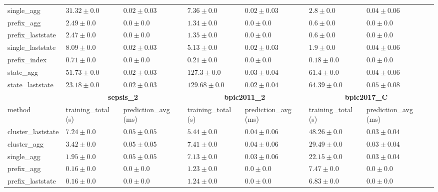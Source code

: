 \documentclass[twoside,11pt]{Latex/Classes/PhDthesisPSnPDF}
\begin{document}
\begin{table}[!htbp]
{\begin{tabular}{llllllll}
					single\_agg & $31.32 \pm 0.0$ & $0.02 \pm 0.03$ & $7.36 \pm 0.0$ & $0.02 \pm 0.03$ & $2.8 \pm 0.0$ & $0.04 \pm 0.06$ \\ 
					prefix\_agg & $2.49 \pm 0.0$ & $\mathbf{0.0 \pm 0.0}$ & $1.34 \pm 0.0$ & $\mathbf{0.0 \pm 0.0}$ & $0.6 \pm 0.0$ & $\mathbf{0.0 \pm 0.0}$ \\ 
					prefix\_laststate & $2.47 \pm 0.0$ & $\mathbf{0.0 \pm 0.0}$ & $1.35 \pm 0.0$ & $\mathbf{0.0 \pm 0.0}$ & $0.6 \pm 0.0$ & $\mathbf{0.0 \pm 0.0}$ \\ 
					single\_laststate & $8.09 \pm 0.0$ & $0.02 \pm 0.03$ & $5.13 \pm 0.0$ & $0.02 \pm 0.03$ & $1.9 \pm 0.0$ & $0.04 \pm 0.06$ \\ 
					prefix\_index & $\mathbf{0.71 \pm 0.0}$ & $\mathbf{0.0 \pm 0.0}$ & $\mathbf{0.21 \pm 0.0}$ & $\mathbf{0.0 \pm 0.0}$ & $\mathbf{0.18 \pm 0.0}$ & $\mathbf{0.0 \pm 0.0}$ \\ 
					state\_agg & $51.73 \pm 0.0$ & $0.02 \pm 0.03$ & $127.3 \pm 0.0$ & $0.03 \pm 0.04$ & $61.4 \pm 0.0$ & $0.04 \pm 0.06$ \\ 
					state\_laststate & $23.18 \pm 0.0$ & $0.02 \pm 0.03$ & $129.68 \pm 0.0$ & $0.02 \pm 0.04$ & $64.39 \pm 0.0$ & $0.05 \pm 0.08$ \\ 
					\bottomrule
					\toprule
					& \multicolumn{2}{c}{{\bfseries sepsis\_2}} & \multicolumn{2}{c}{{\bfseries bpic2011\_2}} & \multicolumn{2}{c}{{\bfseries bpic2017\_C}} \\ \cmidrule(lr){2-3} \cmidrule(lr){4-5} \cmidrule(lr){6-7}
					method  & training\_total (s) & prediction\_avg (ms) & training\_total (s) & prediction\_avg (ms) & training\_total (s) & prediction\_avg (ms) \\ \midrule
					cluster\_laststate & $7.24 \pm 0.0$ & $0.05 \pm 0.05$ & $5.44 \pm 0.0$ & $0.04 \pm 0.06$ & $48.26 \pm 0.0$ & $0.03 \pm 0.04$ \\ 
					cluster\_agg & $3.42 \pm 0.0$ & $0.05 \pm 0.05$ & $7.41 \pm 0.0$ & $0.04 \pm 0.06$ & $29.49 \pm 0.0$ & $0.03 \pm 0.04$ \\ 
					single\_agg & $1.95 \pm 0.0$ & $0.05 \pm 0.05$ & $7.13 \pm 0.0$ & $0.03 \pm 0.06$ & $22.15 \pm 0.0$ & $0.03 \pm 0.04$ \\ 
					prefix\_agg & $0.16 \pm 0.0$ & $\mathbf{0.0 \pm 0.0}$ & $1.23 \pm 0.0$ & $\mathbf{0.0 \pm 0.0}$ & $7.47 \pm 0.0$ & $\mathbf{0.0 \pm 0.0}$ \\ 
					prefix\_laststate & $0.16 \pm 0.0$ & $\mathbf{0.0 \pm 0.0}$ & $1.24 \pm 0.0$ & $\mathbf{0.0 \pm 0.0}$ & $6.83 \pm 0.0$ & $\mathbf{0.0 \pm 0.0}$ \\ 

\end{tabular}}
\end{table}
\end{document}
